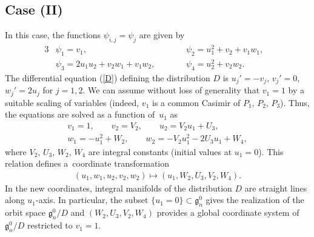 \documentclass[pdftex]{sigma}
\numberwithin{equation}{section}
\begin{document}
\subsection{Case (II)}\label{section3.2}

In this case, the functions $\psi _{i,j} = \psi _j$ are given by
\begin{alignat*}{3}
& \psi _1 = v_1, \qquad && \psi _2 = u_1^2 + v_2 + v_1w_1, & \\
& \psi _3 = 2u_1u_2 + v_2w_1 + v_1w_2, \qquad && \psi _4 = u_2^2+v_2w_2.&
\end{alignat*}
The dif\/ferential equation (\ref{D}) def\/ining the distribution $D$ is $u_j' = -v_j$, $v_j' = 0$, $w_j' = 2u_j$ for $j=1,2$. We can assume without loss of generality that $v_1 = 1$ by a suitable scaling of variables (indeed, $v_1$ is a common Casimir of $P_1$, $P_2$, $P_3$). Thus, the equations are solved as a function of~$u_1$ as
\begin{gather*}
v_1 = 1,\qquad v_2 = V_2,\qquad u_2 = V_2u_1 + U_3,\\ w_1 = -u_1^2 + W_2,\qquad w_2 = -V_2u_1^2 - 2U_3u_1 + W_4,
\end{gather*}
where $V_2$, $U_3$, $W_2$, $W_4$ are integral constants (initial values at $u_1=0$). This relation def\/ines a~coordinate transformation
\begin{gather*}
(u_1, w_1, u_2, v_2, w_2) \mapsto (u_1, W_2, U_3, V_2, W_4).
\end{gather*}
In the new coordinates, integral manifolds of the distribution $D$ are straight lines along $u_1$-axis. In particular, the subset $\{ u_1 = 0\} \subset \mathfrak{g}^0_n$ gives the realization of the orbit space $\mathfrak{g}^0_n/D$ and $(W_2, U_3, V_2, W_4)$ provides a global coordinate system of $\mathfrak{g}^0_n/D$ restricted to $v_1 = 1$.
\end{document}
